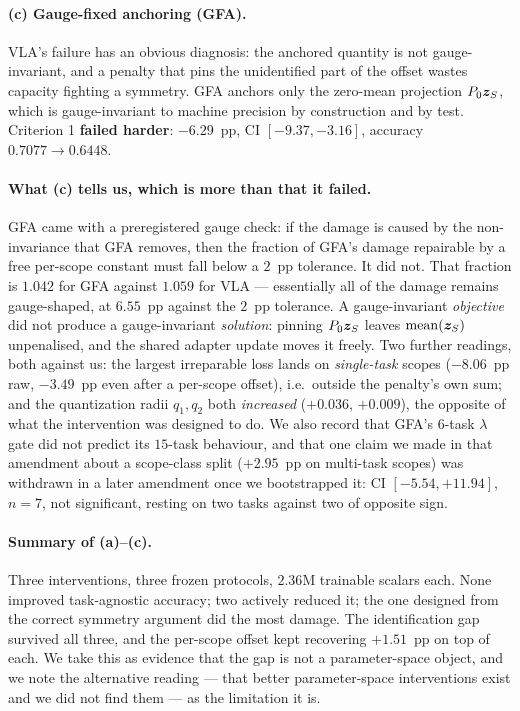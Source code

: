 \paragraph{(c) Gauge-fixed anchoring (GFA).}
VLA's failure has an obvious diagnosis: the anchored quantity is not
gauge-invariant, and a penalty that pins the unidentified part of the offset
wastes capacity fighting a symmetry. GFA anchors only the zero-mean projection
$P_0\bm{z}_S$, which is gauge-invariant to machine precision by construction and by
test. Criterion 1 \textbf{failed harder}: $\mathbf{-6.29}$~pp, CI
$[-9.37,-3.16]$, accuracy $0.7077\to0.6448$.

\paragraph{What (c) tells us, which is more than that it failed.}
GFA came with a preregistered gauge check: if the damage is caused by the
non-invariance that GFA removes, then the fraction of GFA's damage repairable by a
free per-scope constant must fall below a $2$~pp tolerance. It did not. That
fraction is $\mathbf{1.042}$ for GFA against $1.059$ for VLA --- essentially all of
the damage remains gauge-shaped, at $6.55$~pp against the $2$~pp tolerance. A
gauge-invariant \emph{objective} did not produce a gauge-invariant
\emph{solution}: pinning $P_0\bm{z}_S$ leaves $\mathrm{mean}(\bm{z}_S)$ unpenalised, and
the shared adapter update moves it freely. Two further readings, both against us:
the largest irreparable loss lands on \emph{single-task} scopes ($-8.06$~pp raw,
$-3.49$~pp even after a per-scope offset), i.e.\ outside the penalty's own sum;
and the quantization radii $q_1,q_2$ both \emph{increased} ($+0.036$, $+0.009$),
the opposite of what the intervention was designed to do. We also record that
GFA's $6$-task $\lambda$ gate did not predict its $15$-task behaviour, and that
one claim we made in that amendment about a scope-class split ($+2.95$~pp on
multi-task scopes) was withdrawn in a later amendment once we bootstrapped it: CI
$[-5.54,+11.94]$, $n=7$, not significant, resting on two tasks against two of
opposite sign.

\paragraph{Summary of (a)--(c).}
Three interventions, three frozen protocols, $2.36$M trainable scalars each.
None improved task-agnostic accuracy; two actively reduced it; the one designed
from the correct symmetry argument did the most damage. The identification gap
survived all three, and the per-scope offset kept recovering $+1.51$~pp on top of
each. We take this as evidence that the gap is not a parameter-space object, and
we note the alternative reading --- that better parameter-space interventions
exist and we did not find them --- as the limitation it is.

